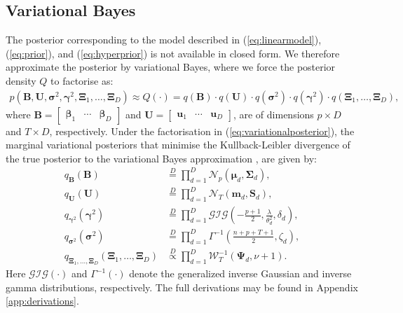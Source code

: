 \documentclass[a4paper,hidelinks]{article}\usepackage[]{graphicx}\usepackage[]{color}
\newcommand{\bbeta}{\bm{\beta}}
\newcommand{\bsigma}{\bm{\sigma}}
\newcommand{\bSigma}{\bm{\Sigma}}
\newcommand{\bmu}{\bm{\mu}}
\newcommand{\bgamma}{\bm{\gamma}}
\newcommand{\B}{\mathbf{B}}
\newcommand{\U}{\mathbf{U}}
\newcommand{\Sm}{\mathbf{S}}
\newcommand{\0}{\bm{0}}
\renewcommand{\(}{\left(}
\renewcommand{\)}{\right)}
\renewcommand{\[}{\left[}
\renewcommand{\]}{\right]}
\begin{document}
	\subsection{Variational Bayes}\label{sec:variationalbayes}
	The posterior corresponding to the model described in (\ref{eq:linearmodel}), (\ref{eq:prior}), and (\ref{eq:hyperprior}) is not available in closed form. We therefore approximate the posterior by variational Bayes, where we force the posterior density $Q$ to factorise as:
	\begin{align}\label{eq:variationalposterior}
	p(\B,\mathbf{U},\mathbf{\sigma}^2, \bgamma^2,\bm{\Xi}_1, \dots, \bm{\Xi}_D) \approx Q(\cdot) = q(\B) \cdot q(\mathbf{U}) \cdot q(\mathbf{\sigma}^2) \cdot q(\bgamma^2) \cdot q(\bm{\Xi}_1, \dots, \bm{\Xi}_D),
	\end{align}
	where $\B = \begin{bmatrix} \bbeta_1 & \cdots & \bbeta_D \end{bmatrix}$ and $\U = \begin{bmatrix} \mathbf{u}_1 & \cdots & \mathbf{u}_D \end{bmatrix}$, are of dimensions $p \times D$ and $T \times D$, respectively. Under the factorisation in (\ref{eq:variationalposterior}), the marginal variational posteriors that minimise the Kullback-Leibler divergence of the true posterior to the variational Bayes approximation \cite[]{neal_view_1998}, are given by:
	\begin{subequations}\label{eq:variationalposterior2}
		\begin{align}
		q_{\B} (\B) & \overset{D}{=} \prod_{d=1}^{D} \mathcal{N}_p (\bmu_d, \bSigma_d), \\
		q_{\U}(\U) & \overset{D}{=} \prod_{d=1}^{D} \mathcal{N}_T (\mathbf{m}_d, \Sm_d), \\
		q_{\bgamma^{2}}(\bgamma^{2}) & \overset{D}{=} \prod_{d=1}^D \mathcal{GIG} \(-\frac{p+1}{2}, \frac{\lambda}{\theta_d^2}, \delta_{d} \), \\
		q_{\bsigma^{2}}(\bsigma^{2}) & \overset{D}{=} \prod_{d=1}^D \Gamma^{-1} \(\frac{n + p + T + 1}{2}, \zeta_{d} \), \\
		q_{\bm{\Xi}_1, \dots, \bm{\Xi}_D}(\bm{\Xi}_1, \dots, \bm{\Xi}_D) & \overset{D}{\propto} \prod_{d=1}^D \mathcal{W}_T^{-1} (\bm{\Psi}_d, \nu + 1).
		\end{align}
	\end{subequations}
	Here $\mathcal{GIG}(\cdot)$ and $\Gamma^{-1}(\cdot)$ denote the generalized inverse Gaussian and inverse gamma distributions, respectively. The full derivations may be found in Appendix \ref{app:derivations}.	
	
\end{document}
